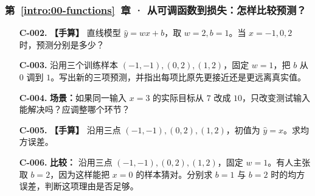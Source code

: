 \subsubsection*{第~\ref*{intro:00-functions}~章 · 从可调函数到损失：怎样比较预测？}
\begin{enumerate}[label={},leftmargin=4.8em,itemsep=4pt]
\item[\textbf{C-002.}] \leavevmode{}\label{exercise:C-002}\label{exercise:linear-prediction}\label{exercise:linked-00-functions}  \textbf{【手算】} 直线模型 $\widehat{y}=wx+b$，取 $w=2,b=1$。当 $x=-1,0,2$ 时，预测分别是多少？
\item[\textbf{C-003.}] \leavevmode{}\label{exercise:C-003}\label{exercise:bias-shift}沿用三个训练样本 $(-1,-1),(0,2),(1,2)$，固定 $w=1$，把 $b$ 从 $0$ 调到 $1$。写出新的三项预测，并指出每项比原先更接近还是更远离真实值。
\item[\textbf{C-004.}] \leavevmode{}\label{exercise:C-004}\label{exercise:target-change}\textbf{场景：}如果同一输入 $x=3$ 的实际目标从 $7$ 改成 $10$，只改变测试输入能解决吗？应调整哪个环节？
\item[\textbf{C-005.}] \leavevmode{}\label{exercise:C-005}\label{exercise:three-point-mse}\textbf{【手算】} 沿用三点 $(-1,-1),(0,2),(1,2)$，初值为 $\widehat{y}=x$。求均方误差。
\item[\textbf{C-006.}] \leavevmode{}\label{exercise:C-006}\label{exercise:bias-candidate-comparison}\textbf{比较：} 沿用三点 $(-1,-1),(0,2),(1,2)$，固定 $w=1$。有人主张取 $b=2$，因为这样能把 $x=0$ 的样本猜对。分别求 $b=1$ 与 $b=2$ 时的均方误差，判断这项理由是否足够。
\end{enumerate}
